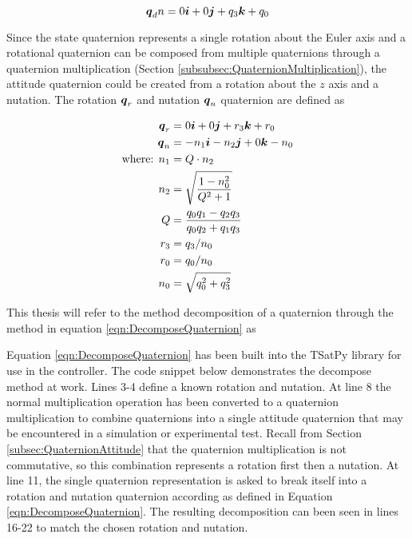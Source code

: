 \begin{equation}
  \boldsymbol{q}_dn = 0 \boldsymbol{i} + 0 \boldsymbol{j} +q_3 \boldsymbol{k} + q_0
  \label{eqn:NutationDesiredQuaternion}
\end{equation}

Since the state quaternion represents a single rotation about the Euler axis and a rotational quaternion can be composed from multiple quaternions through a quaternion multiplication (Section \ref{subsubsec:QuaternionMultiplication}), the attitude quaternion could be created from a rotation about the $z$ axis and a nutation.  The rotation $\boldsymbol{q}_r$ and nutation $\boldsymbol{q}_n$ quaternion are defined as

\begin{subequations}
  \begin{align}
    \boldsymbol{q}_r &= 0 \boldsymbol{i} + 0 \boldsymbol{j} + r_3 \boldsymbol{k} + r_0\\
    \boldsymbol{q}_n &= -n_1 \boldsymbol{i} - n_2 \boldsymbol{j} + 0 \boldsymbol{k} - n_0 \\
    \text{where: } n_1 &= Q \cdot n_2 \\
    n_2 &= \sqrt{\frac{1 - n_0^2}{Q^2 + 1}} \\
    Q &= \frac{q_0 q_1 - q_2 q_3}{q_0 q_2 + q_1 q_3} \\
    r_3 &= q_3 / n_0 \\
    r_0 &= q_0 / n_0 \\
    n_0 &= \sqrt{q_0^2 + q_3^2}
  \end{align}
  \label{eqn:DecomposeQuaternion}
\end{subequations}

This thesis will refer to the method decomposition of a quaternion through the method in equation \ref{eqn:DecomposeQuaternion} as


Equation \ref{eqn:DecomposeQuaternion} has been built into the TSatPy library for use in the controller.  The code snippet below demonstrates the decompose method at work.  Lines 3-4 define a known rotation and nutation.  At line 8 the normal multiplication operation has been converted to a quaternion multiplication to combine quaternions into a single attitude quaternion that may be encountered in a simulation or experimental test.  Recall from Section \ref{subsec:QuaternionAttitude} that the quaternion multiplication is not commutative, so this combination represents a rotation first then a nutation.  At line 11, the single quaternion representation is asked to break itself into a rotation and nutation quaternion according as defined in Equation \ref{eqn:DecomposeQuaternion}.  The resulting decomposition can been seen in lines 16-22 to match the chosen rotation and nutation.

